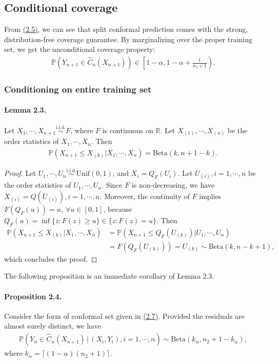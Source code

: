 \documentclass{article}
\numberwithin{equation}{section}
\begin{document}
\subsection{Conditional coverage}
From \hyperref[2.5]{(2.5)}, we can see that split conformal prediction comes with the strong, distribution-free coverage guarantee. By marginalizing over the proper training set, we get the unconditional coverage property:
\begin{align*}
	\mathbb{P}\left(Y_{n+1}\in\widehat{C}_n(X_{n+1})\right) \in \left[1-\alpha,1-\alpha + \frac{1}{n_2+1}\right).\tag{2.20}
\end{align*}

\subsubsection{Conditioning on entire training set}
\paragraph{Lemma 2.3.} Let $X_1,\cdots,X_{n+1}\overset{\mathrm{i.i.d.}}{\sim}F$, where $F$ is continuous on $\mathbb{R}$. Let $X_{(1)},\cdots,X_{(n)}$ be the order statistics of $X_1,\cdots,X_n.$ Then 
\begin{align*}
	\mathbb{P}(X_{n+1}\leq X_{(k)}|X_1,\cdots,X_n) = \mathrm{Beta}(k,n+1-k).\tag{2.21}
\end{align*}
\begin{proof}
Let $U_1,\cdots,U_{n}\overset{\mathrm{i.i.d.}}{\sim} \mathrm{Unif}(0,1)$, and $X_i=Q_F(U_i)$. Let $U_{(i)},i=1,\cdots,n$ be the order statistics of $U_1,\cdots,U_n$. Since $F$ is non-decreasing, we have $X_{(i)}=Q(U_{(i)}),i=1,\cdots,n$. Moreover, the continuity of $F$ implies $F(Q_F(u))=u,\ \forall u\in[0,1]$, because $Q_F(u)=\inf\{z:F(z)\geq u\}\in\{z:F(z)=u\}.$ Then
\begin{align*}
	\mathbb{P}(X_{n+1}\leq X_{(k)}|X_1,\cdots,X_n) &= \mathbb{P}(X_{n+1}\leq Q_F(U_{(k)})|U_1,\cdots,U_n)\\ &=F(Q_F(U_{(k)})) = U_{(k)}\sim \mathrm{Beta}(k,n-k+1),\tag{2.22}
\end{align*}
which concludes the proof.
\end{proof}

The following proposition is an immediate corollary of Lemma 2.3.
\paragraph{Proposition 2.4.} Consider the form of conformal set given in \hyperref[2.7]{(2.7)}. Provided the residuals are almost surely distinct, we have
\begin{align*}
	\mathbb{P}\left(Y_n\in\widehat{C}_n(X_{n+1})\,\big|\,(X_i,Y_i),i=1,\cdots,n\right)\sim\mathrm{Beta}\left(k_\alpha,n_2+1-k_\alpha\right),\tag{2.23}
\end{align*}
where $k_\alpha = \lceil(1-\alpha)(n_2+1)\rceil$.
\end{document}
